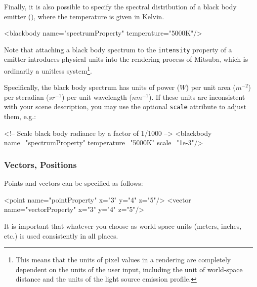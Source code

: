 \label{sec:blackbody}
Finally, it is also possible to specify the spectral distribution of a black body emitter (), 
where the temperature is given in Kelvin.
\begin{xml}
<blackbody name="spectrumProperty" temperature="5000K"/>
\end{xml}
Note that attaching a black body spectrum to the \texttt{intensity} property
of a emitter introduces physical units into the rendering process of 
Mitsuba, which is ordinarily a unitless system\footnote{This means that the 
units of pixel values in a rendering are completely dependent on the units of 
the user input, including the unit of world-space distance and the units of 
the light source emission profile.}.

Specifically, the black body spectrum has units of power ($W$) per 
unit area ($m^{-2}$) per steradian ($sr^{-1}$) per unit wavelength ($nm^{-1}$).
If these units are inconsistent with your scene description, you may use the
optional \texttt{scale} attribute to adjust them, e.g.:
\begin{xml}
<!-- Scale black body radiance by a factor of 1/1000 -->
<blackbody name="spectrumProperty" temperature="5000K" scale="1e-3"/>
\end{xml}

\subsubsection{Vectors, Positions}
Points and vectors can be specified as follows:
\begin{xml}
<point name="pointProperty" x="3" y="4" z="5"/>
<vector name="vectorProperty" x="3" y="4" z="5"/>
\end{xml}
It is important that whatever you choose as world-space units (meters, inches, etc.) is 
used consistently in all places.

